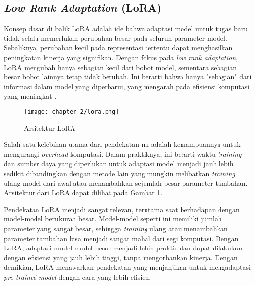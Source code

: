 \subsection{\textit{Low Rank Adaptation} (LoRA)}

Konsep dasar di balik LoRA adalah ide bahwa adaptasi model untuk tugas baru tidak selalu memerlukan perubahan besar pada seluruh parameter model. Sebaliknya, perubahan kecil pada representasi tertentu dapat menghasilkan peningkatan kinerja yang signifikan. Dengan fokus pada \textit{low rank adaptation}, LoRA mengubah hanya sebagian kecil dari bobot model, sementara sebagian besar bobot lainnya tetap tidak berubah. Ini berarti bahwa hanya "sebagian" dari informasi dalam model yang diperbarui, yang mengarah pada efisiensi komputasi yang meningkat \parencite{lora}.

\begin{figure}[ht]
    \centering
    \texttt{[image: chapter-2/lora.png]}
    \caption{Arsitektur LoRA \parencite{lora}}
    \label{fig:lora}
\end{figure}

Salah satu kelebihan utama dari pendekatan ini adalah kemampuannya untuk mengurangi \textit{overhead} komputasi. Dalam praktiknya, ini berarti waktu \textit{training} dan sumber daya yang diperlukan untuk adaptasi model menjadi jauh lebih sedikit dibandingkan dengan metode lain yang mungkin melibatkan \textit{training} ulang model dari awal atau menambahkan sejumlah besar parameter tambahan. Arsitektur dari LoRA dapat dilihat pada Gambar \ref{fig:lora}.

Pendekatan LoRA menjadi sangat relevan, terutama saat berhadapan dengan model-model berukuran besar. Model-model seperti ini memiliki jumlah parameter yang sangat besar, sehingga \textit{training} ulang atau menambahkan parameter tambahan bisa menjadi sangat mahal dari segi komputasi. Dengan LoRA, adaptasi model-model besar menjadi lebih praktis dan dapat dilakukan dengan efisiensi yang jauh lebih tinggi, tanpa mengorbankan kinerja.
Dengan demikian, LoRA menawarkan pendekatan yang menjanjikan untuk mengadaptasi \textit{pre-trained model} dengan cara yang lebih efisien.